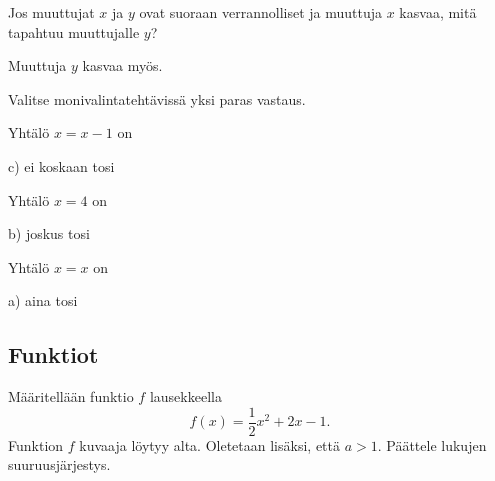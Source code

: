 \begin{tehtava}
Jos muuttujat $x$ ja $y$ ovat suoraan verrannolliset ja muuttuja $x$ kasvaa, mitä tapahtuu muuttujalle $y$?
\begin{vastaus}
Muuttuja $y$ kasvaa myös.
\end{vastaus}
\end{tehtava}

Valitse monivalintatehtävissä yksi paras vastaus.

\begin{tehtava}
Yhtälö $x = x-1$ on
\begin{alakohdat}
\end{alakohdat}
\begin{vastaus}
c) ei koskaan tosi
\end{vastaus}
\end{tehtava}

\begin{tehtava}
Yhtälö $x = 4$ on
\begin{alakohdat}
\end{alakohdat}
\begin{vastaus}
b) joskus tosi
\end{vastaus}
\end{tehtava}

\begin{tehtava}
Yhtälö $x = x$ on
\begin{alakohdat}
\end{alakohdat}
\begin{vastaus}
a) aina tosi
\end{vastaus}
\end{tehtava}

\subsection*{Funktiot}

\begin{tehtava}
	Määritellään funktio $f$ lausekkeella \[f(x)=\frac{1}{2}x^2+2x-1.\] Funktion $f$ kuvaaja löytyy alta. 
	Oletetaan lisäksi, että $a>1$. Päättele lukujen suuruusjärjestys.
	\begin{alakohdat}
	\end{alakohdat}
    \begin{vastaus}
	\begin{alakohdat}
		\alakohta{$f(a)>f(a+2)$}
		\alakohta{$f(-a)<f(a)$}
	\end{alakohdat}
    \end{vastaus}
\end{tehtava}
\vspace{1cm}
\begin{center}
	\begin{kuvaajapohja}{0.7}{-3}{7}{-5}{3}
	\end{kuvaajapohja}
\end{center}


